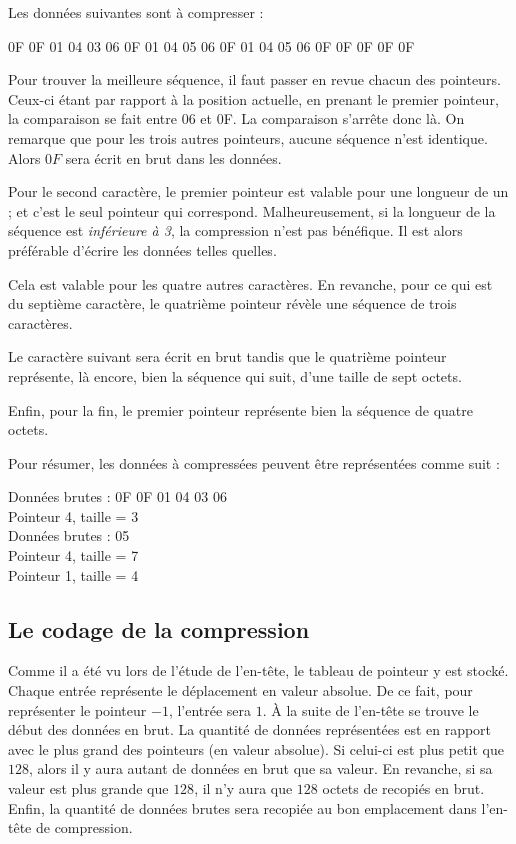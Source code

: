 Les données suivantes sont à compresser :
\begin{exemple}
0F 0F 01 04 03 06 0F 01 04 05 06 0F 01 04 05 06 0F 0F 0F 0F 0F
\end{exemple}

Pour trouver la meilleure séquence, il faut passer en revue chacun des
pointeurs. Ceux-ci étant par rapport à la position actuelle, en prenant
le premier pointeur, la comparaison se fait entre 06 et 0F. La comparaison
s'arrête donc là. On remarque que pour les trois autres pointeurs, aucune
séquence n'est identique. Alors $0F$ sera écrit en brut dans les données.

Pour le second caractère, le premier pointeur est valable pour une longueur
de un ; et c'est le seul pointeur qui correspond. Malheureusement, si la
longueur de la séquence est \emph{inférieure à 3}, la compression n'est pas
bénéfique. Il est alors préférable d'écrire les données telles quelles.

Cela est valable pour les quatre autres caractères. En revanche, pour ce qui
est du septième caractère, le quatrième pointeur révèle une séquence de trois
caractères.

Le caractère suivant sera écrit en brut tandis que le quatrième
pointeur représente, là encore, bien la séquence qui suit, d'une taille de
sept octets.

Enfin, pour la fin, le premier pointeur représente bien la séquence de quatre
octets.
\medskip

Pour résumer, les données à compressées peuvent être représentées comme suit :

\begin{exemple}
Données brutes : 0F 0F 01 04 03 06 \\
Pointeur 4, taille = 3 \\
Données brutes : 05 \\
Pointeur 4, taille = 7 \\
Pointeur 1, taille = 4
\end{exemple}


\subsection{Le codage de la compression}
Comme il a été vu lors de l'étude de l'en-tête, le tableau de pointeur y est
stocké. Chaque entrée représente le déplacement en valeur absolue. De ce fait,
pour représenter le pointeur $-1$, l'entrée sera $1$. À la suite de l'en-tête
se trouve le début des données en brut. La quantité de données représentées
est en rapport avec le plus grand des pointeurs (en valeur absolue). Si
celui-ci est plus petit que $128$, alors il y aura autant de données en brut
que sa valeur. En revanche, si sa valeur est plus grande que $128$, il n'y aura
que $128$ octets de recopiés en brut. Enfin, la quantité de données brutes
sera recopiée au bon emplacement dans l'en-tête de compression.

